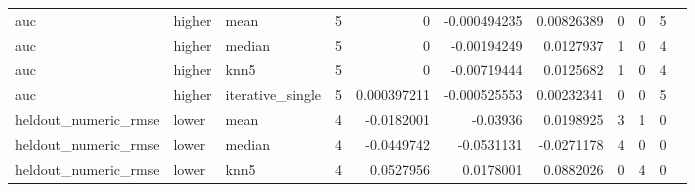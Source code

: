 \begin{table}[ht]
{\begin{tabular}{lllrrrrrrrl}
 auc                            & higher             & mean             &            5 &                            0           &          -0.000494235 &             0.00826389 &                         0 &                        0 &                                5 &                                                                                                                    \\
 auc                            & higher             & median           &            5 &                            0           &          -0.00194249  &             0.0127937  &                         1 &                        0 &                                4 &                                                                                                                    \\
 auc                            & higher             & knn5             &            5 &                            0           &          -0.00719444  &             0.0125682  &                         1 &                        0 &                                4 &                                                                                                                    \\
 auc                            & higher             & iterative\_single &            5 &                            0.000397211 &          -0.000525553 &             0.00232341 &                         0 &                        0 &                                5 &                                                                                                                    \\
 heldout\_numeric\_rmse           & lower              & mean             &            4 &                           -0.0182001   &          -0.03936     &             0.0198925  &                         3 &                        1 &                                0 &                                                                                                                    \\
 heldout\_numeric\_rmse           & lower              & median           &            4 &                           -0.0449742   &          -0.0531131   &            -0.0271178  &                         4 &                        0 &                                0 &                                                                                                                    \\
 heldout\_numeric\_rmse           & lower              & knn5             &            4 &                            0.0527956   &           0.0178001   &             0.0882026  &                         0 &                        4 &                                0 &                                                                                                                    \\

\end{tabular}}
\end{table}
